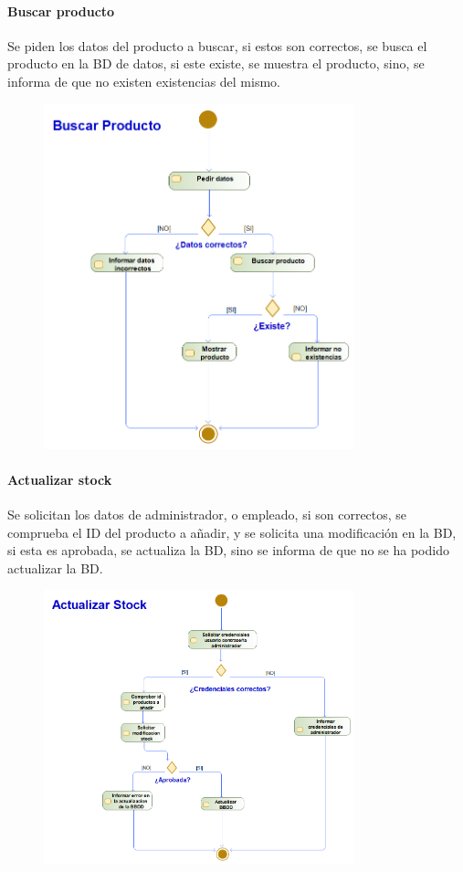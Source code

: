 \paragraph{Buscar producto}
Se piden los datos del producto a buscar, si estos son correctos, se busca el producto en la BD de datos, si este existe, se muestra el producto, sino, se informa de que no existen existencias del mismo.
\begin{figure}[H]
    \centering
    \includegraphics[width=0.8\textwidth]{Use_Cases/ProyectoIS_BuscarProducto.png}
\end{figure}
\newpage
\paragraph{Actualizar stock}
Se solicitan los datos de administrador, o empleado, si son correctos, se comprueba el ID del producto a añadir, y se solicita una modificación en la BD, si esta es aprobada, se actualiza la BD, sino se informa de que no se ha podido actualizar la BD.
\begin{figure}[H]
    \centering
    \includegraphics[width=0.8\textwidth]{Use_Cases/ProyectoIS_ActualizarStock.png}
\end{figure}
\newpage
